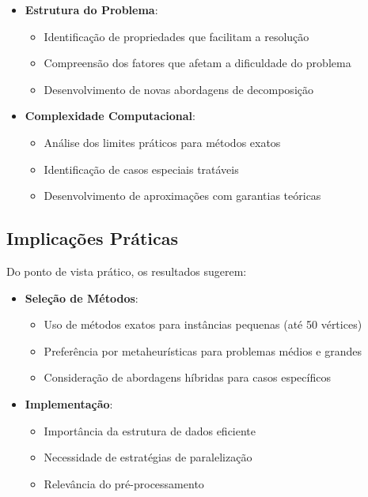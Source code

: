 \documentclass[12pt, a4paper]{report}
\begin{document}
\begin{itemize}
    \item \textbf{Estrutura do Problema}:
    \begin{itemize}
        \item Identificação de propriedades que facilitam a resolução
        \item Compreensão dos fatores que afetam a dificuldade do problema
        \item Desenvolvimento de novas abordagens de decomposição
    \end{itemize}
    
    \item \textbf{Complexidade Computacional}:
    \begin{itemize}
        \item Análise dos limites práticos para métodos exatos
        \item Identificação de casos especiais tratáveis
        \item Desenvolvimento de aproximações com garantias teóricas
    \end{itemize}
\end{itemize}

\subsection{Implicações Práticas}
Do ponto de vista prático, os resultados sugerem:

\begin{itemize}
    \item \textbf{Seleção de Métodos}:
    \begin{itemize}
        \item Uso de métodos exatos para instâncias pequenas (até 50 vértices)
        \item Preferência por metaheurísticas para problemas médios e grandes
        \item Consideração de abordagens híbridas para casos específicos
    \end{itemize}
    
    \item \textbf{Implementação}:
    \begin{itemize}
        \item Importância da estrutura de dados eficiente
        \item Necessidade de estratégias de paralelização
        \item Relevância do pré-processamento
    \end{itemize}
\end{itemize}
\end{document}
